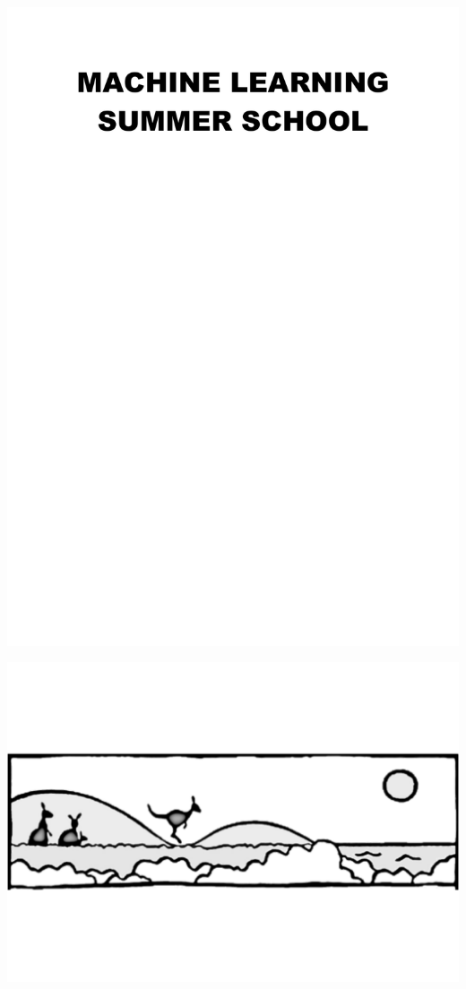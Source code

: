 \documentclass[12pt]{article}
\begin{document}
\thispagestyle{empty}


 \centerline{\includegraphics[width=15cm]{mlss-title}}

\vspace{5cm}

\centerline{\includegraphics[width=15cm]{mlss-sydney-cartoon-bw3}}
\end{document}
